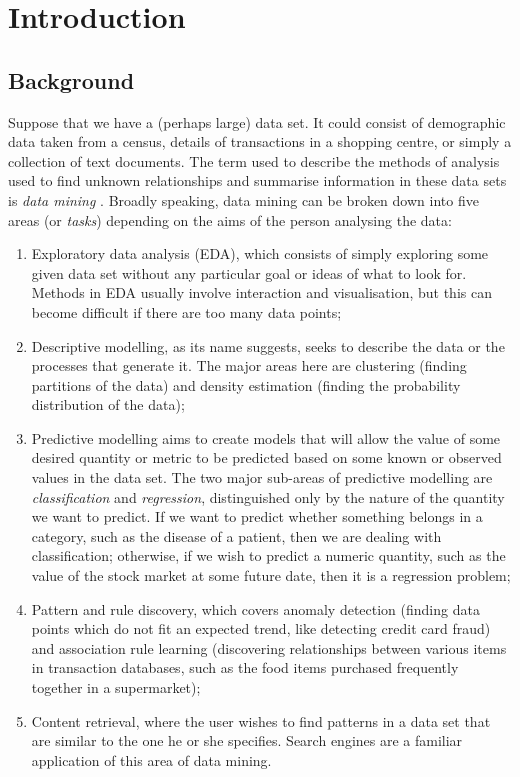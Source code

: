 \chapter{Introduction}

\section{Background}
Suppose that we have a (perhaps large) data set. It could consist of
demographic data taken from a census, details of transactions in a shopping
centre, or simply a collection of text documents. The term used to describe
the methods of analysis used to find unknown relationships and summarise
information in these data sets is \textit{data mining} \citep{Hand2001}.
Broadly speaking,
data mining can be broken down into five areas (or \textit{tasks}) depending
on the aims of the person analysing the data:

\begin{enumerate}
\item Exploratory data analysis (EDA), which consists of simply exploring some
given data set without any particular goal or ideas of what to look for.
Methods in EDA usually involve interaction and visualisation, but this can
become difficult if there are too many data points;
\item Descriptive modelling, as its name suggests, seeks to describe the data
or the processes that generate it. The major areas here are clustering (finding
partitions of the data) and density estimation (finding the probability
distribution of the data);
\item Predictive modelling aims to create models that will allow the value of
some desired quantity or metric to be predicted based on some known or observed
values in the data set. The two major sub-areas of predictive modelling are
\textit{classification} and \textit{regression}, distinguished only by the
nature of the quantity we want to predict. If we want to predict whether
something belongs in a category, such as the disease of a patient, then we
are dealing with classification; otherwise, if we wish to predict a numeric
quantity, such as the value of the stock market at some future date, then
it is a regression problem;
\item Pattern and rule discovery, which covers anomaly detection (finding data
points which do not fit an expected trend, like detecting credit card fraud)
and association rule learning (discovering relationships between various items
in transaction databases, such as the food items purchased frequently together
in a supermarket);
\item Content retrieval, where the user wishes to find patterns in a data set
that are similar to the one he or she specifies. Search engines are a familiar
application of this area of data mining.
\end{enumerate}


